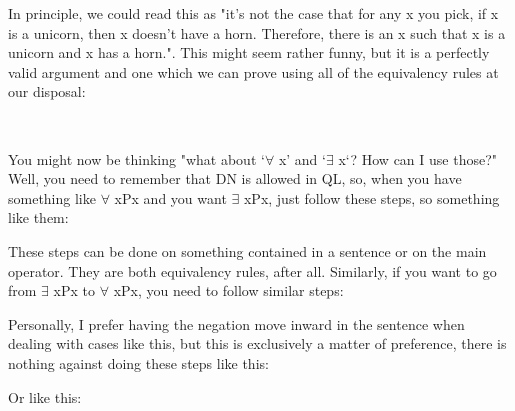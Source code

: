 In principle, we could read this as "it's not the case that for any x you pick, if x is a unicorn, then x doesn't have a horn. Therefore, there is an x such that x is a unicorn and x has a horn.". This might seem rather funny, but it is a perfectly valid argument and one which we can prove using all of the equivalency rules at our disposal:
\begin{fitchproof}
 
\end{fitchproof}
You might now be thinking "what about `\enot $\forall$ x\enot' and `\enot $\exists$ x\enot`? How can I use those?" Well, you need to remember that DN is allowed in QL, so, when you have something like \enot $\forall$ x\enot Px and you want $\exists$ xPx, just follow these steps, so something like them:
\begin{fitchproof}
\end{fitchproof}
These steps can be done on something contained in a sentence or on the main operator. They are both equivalency rules, after all. Similarly, if you want to go from \enot $\exists$ x\enot Px to $\forall$ xPx, you need to follow similar steps:
\begin{fitchproof}
\end{fitchproof}

Personally, I prefer having the negation move inward in the sentence when dealing with cases like this, but this is exclusively a matter of preference, there is nothing against doing these steps like this: 
\begin{fitchproof}
\end{fitchproof}

Or like this:
\begin{fitchproof}
\end{fitchproof}

\barcan